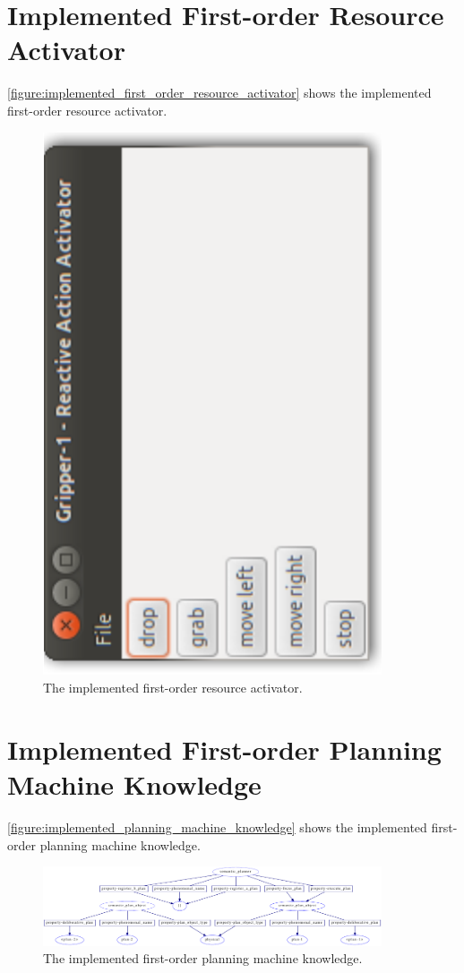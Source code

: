 \section{Implemented First-order Resource Activator}

{\mbox{\autoref{figure:implemented_first_order_resource_activator}}}
shows the implemented first-order resource activator.
\begin{figure}
\includegraphics[width=10cm]{gfx/implemented_first_order_resource_activator}
\caption[The implemented first-order resource activator.]{The
  implemented first-order resource activator.}
\label{figure:implemented_first_order_resource_activator}
\end{figure}

\section{Implemented First-order Planning Machine Knowledge}

{\mbox{\autoref{figure:implemented_planning_machine_knowledge}}} shows
the implemented first-order planning machine knowledge.
\begin{figure}
\includegraphics[width=10cm]{gfx/implemented_planning_machine_knowledge}
\caption[The implemented first-order planning machine knowledge.]{The
  implemented first-order planning machine knowledge.}
\label{figure:implemented_first_order_planning_machine_knowledge}
\end{figure}

